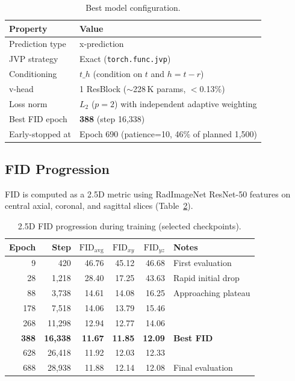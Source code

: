 \documentclass[11pt,a4paper]{article}
\newcommand{\FID}{\mathrm{FID}}
\newcommand{\code}[1]{\texttt{#1}}
\begin{document}
\begin{table}[ht]
\centering
\caption{Best model configuration.}
\label{tab:best_model}
\begin{tabular}{ll}
\toprule
\textbf{Property} & \textbf{Value} \\
\midrule
Prediction type   & x-prediction \\
JVP strategy      & Exact (\code{torch.func.jvp}) \\
Conditioning      & $t\_h$ (condition on $t$ and $h=t{-}r$) \\
v-head            & 1 ResBlock (${\sim}$228\,K params, $<$0.13\%) \\
Loss norm         & $L_2$ ($p{=}2$) with independent adaptive weighting \\
Best FID epoch    & \textbf{388} (step 16,338) \\
Early-stopped at  & Epoch 690 (patience=10, 46\% of planned 1,500) \\
\bottomrule
\end{tabular}
\end{table}

\subsection{FID Progression}

FID is computed as a 2.5D metric using RadImageNet ResNet-50 features on
central axial, coronal, and sagittal slices (Table~\ref{tab:fid}).

\begin{table}[ht]
\centering
\caption{2.5D FID progression during training (selected checkpoints).}
\label{tab:fid}
\begin{tabular}{rrrrrl}
\toprule
\textbf{Epoch} & \textbf{Step} & $\FID_{\mathrm{avg}}$ & $\FID_{xy}$ & $\FID_{yz}$ & \textbf{Notes} \\
\midrule
9    & 420    & 46.76 & 45.12 & 46.68 & First evaluation \\
28   & 1,218  & 28.40 & 17.25 & 43.63 & Rapid initial drop \\
88   & 3,738  & 14.61 & 14.08 & 16.25 & Approaching plateau \\
178  & 7,518  & 14.06 & 13.79 & 15.46 & \\
268  & 11,298 & 12.94 & 12.77 & 14.06 & \\
\textbf{388} & \textbf{16,338} & \textbf{11.67} & \textbf{11.85} & \textbf{12.09} & \textbf{Best FID} \\
628  & 26,418 & 11.92 & 12.03 & 12.33 & \\
688  & 28,938 & 11.88 & 12.14 & 12.08 & Final evaluation \\
\bottomrule
\end{tabular}
\end{table}
\end{document}
